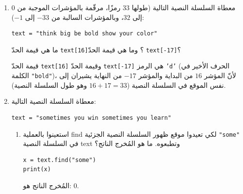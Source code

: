 \documentclass[14pt]{extarticle}
\begin{document}
\begin{enumerate}[label=\textbf{تمرين \arabic*:}, wide=0pt, itemsep=2.2em]
\item معطاة السلسلة النصية التالية (طولها $33$ رمزًا، مرقّمة بالمؤشرات الموجبة من $0$ إلى $32$، وبالمؤشرات السالبة من $-33$ إلى $-1$):

\begin{boxCode}
\begin{english}
\begin{verbatim}
text = "think big be bold show your color"
\end{verbatim}
\end{english}
\end{boxCode}

ما هي قيمة الحدّ \textenglish{\texttt{text[16]}}؟ وما هي قيمة الحدّ \textenglish{\texttt{text[-17]}}؟

\ifwithsols
\begin{boxSolution}
قيمة الحدّ \textenglish{\texttt{text[16]}} وقيمة الحدّ \textenglish{\texttt{text[-17]}} هي الرمز \textenglish{\texttt{'d'}} (الحرف الأخير في الكلمة \textenglish{\texttt{"bold"}})، لأنّ المؤشر $16$ من البداية والمؤشر $-17$ من النهاية يشيران إلى نفس الموقع في السلسلة النصية ($16 + 17 = 33$ وهو طول السلسلة النصية).
\end{boxSolution}
\fi
\filbreak

\item معطاة السلسلة النصية التالية:

\begin{boxCode}
\begin{english}
\begin{verbatim}
text = "sometimes you win sometimes you learn"
\end{verbatim}
\end{english}
\end{boxCode}

\begin{enumerate}[label=\alph*.]
\item استعينوا بالعملية \textenglish{find} لكي تعيدوا موقع ظهور السلسلة النصية الجزئية \textenglish{\texttt{"some"}} في السلسلة النصية \textenglish{text} وتطبعوه. ما هو المُخرج الناتج؟
\ifwithsols
\begin{boxSolution}
\begin{english}
\begin{verbatim}
x = text.find("some")
print(x)
\end{verbatim}
\end{english}
المُخرج الناتج هو: $0$.
\end{boxSolution}
\fi
\filbreak


\end{enumerate}
\end{enumerate}
\end{document}
